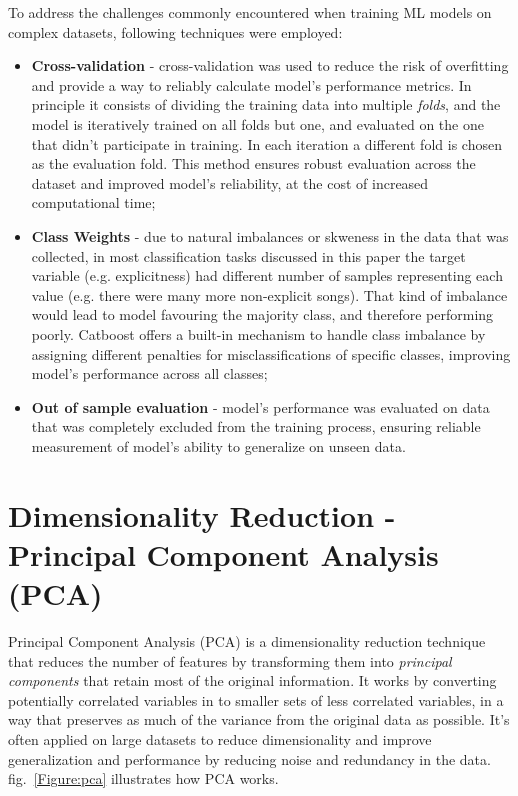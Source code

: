 To address the challenges commonly encountered when training ML models on
complex datasets, following techniques were employed:

\begin{itemize}
  \item \textbf{Cross-validation} - cross-validation was used to reduce the
    risk of overfitting and provide a way to reliably calculate model's
    performance metrics. In principle it consists of dividing the training
    data into multiple \textit{folds}, and the model is iteratively trained
    on all folds but one, and evaluated on the one that didn't participate in
    training. In each iteration a different fold is chosen as the evaluation
    fold. This method ensures robust evaluation across the dataset and improved
    model's reliability, at the cost of increased computational time;
  \item \textbf{Class Weights} - due to natural imbalances or skweness in the
    data that was collected, in most classification tasks discussed in this
    paper the target variable (e.g. explicitness) had different number of samples
    representing each value (e.g. there were many more non-explicit songs). That
    kind of imbalance would lead to model favouring the majority class, and
    therefore performing poorly. Catboost offers a built-in mechanism to handle
    class imbalance by assigning different penalties for misclassifications
    of specific classes, improving model's performance across all classes;
  \item \textbf{Out of sample evaluation} - model's performance was evaluated
    on data that was completely excluded from the training process, ensuring
    reliable measurement of model's ability to generalize on unseen data.
\end{itemize}

\section{Dimensionality Reduction - Principal Component Analysis (PCA)}
\label{sec:dimensionalityreduction}
Principal Component Analysis (PCA) is a dimensionality reduction technique
that reduces the number of features by transforming them into \textit{principal
components} that retain most of the original information. It works by
converting potentially correlated variables in to smaller sets of less correlated
variables, in a way that preserves as much of the variance from the original
data as possible. It's often applied on large datasets to reduce dimensionality
and improve generalization and performance by reducing noise and redundancy
in the data. fig.~\ref{Figure:pca} illustrates how PCA works. \cite{pca} 

